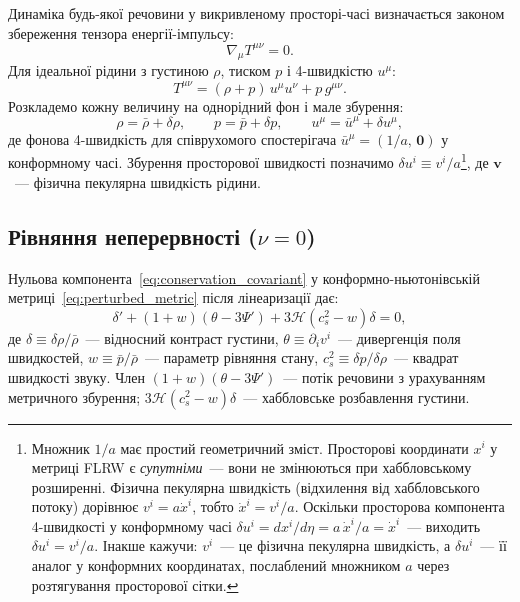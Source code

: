 Динаміка будь-якої речовини у викривленому просторі-часі
визначається законом збереження тензора енергії-імпульсу:
\begin{equation}\label{eq:conservation_covariant}
  \nabla_\mu T^{\mu\nu} = 0.
\end{equation}
Для ідеальної рідини з густиною $\rho$, тиском $p$ і
4-швидкістю $u^\mu$:
\begin{equation}\label{eq:Tmunu_fluid}
  T^{\mu\nu} = (\rho + p)\,u^\mu u^\nu + p\,g^{\mu\nu}.
\end{equation}
Розкладемо кожну величину на однорідний фон і мале збурення:
\begin{equation*}
  \rho = \bar\rho + \delta\rho, \qquad
  p    = \bar p   + \delta p,   \qquad
  u^\mu = \bar u^\mu + \delta u^\mu,
\end{equation*}
де фонова 4-швидкість для співрухомого спостерігача
$\bar u^\mu = (1/a,\, \mathbf{0})$ у конформному часі.
Збурення просторової швидкості позначимо
$\delta u^i \equiv v^i/a$\footnote{%
Множник $1/a$ має простий геометричний зміст.
Просторові координати $x^i$ у метриці FLRW є \emph{супутніми}~---
вони не змінюються при хаббловському розширенні.
Фізична пекулярна швидкість (відхилення від хаббловського потоку)
дорівнює $v^i = a\dot{x}^i$, тобто $\dot{x}^i = v^i/a$.
Оскільки просторова компонента 4-швидкості у конформному часі
$\delta u^i = dx^i/d\eta = a\,\dot{x}^i/a = \dot{x}^i$~---
виходить $\delta u^i = v^i/a$.
Інакше кажучи: $v^i$~--- це фізична пекулярна швидкість,
а $\delta u^i$~--- її аналог у конформних координатах,
послаблений множником $a$ через розтягування просторової сітки.%
}, де $\mathbf{v}$~--- фізична
пекулярна швидкість рідини.

\subsection*{Рівняння неперервності ($\nu = 0$)}

Нульова компонента~\eqref{eq:conservation_covariant}
у конформно-ньютонівській метриці~\eqref{eq:perturbed_metric}
після лінеаризації дає:
\begin{equation}\label{eq:continuity_general}
  \delta' + (1+w)\left(\theta - 3\Psi'\right)
  + 3\mathcal{H}\left(c_s^2 - w\right)\delta = 0,
\end{equation}
де $\delta \equiv \delta\rho/\bar\rho$~--- відносний контраст
густини, $\theta \equiv \partial_i v^i$~--- дивергенція поля
швидкостей, $w \equiv \bar p/\bar\rho$~--- параметр рівняння
стану, $c_s^2 \equiv \delta p/\delta\rho$~--- квадрат швидкості
звуку. Член $(1+w)(\theta - 3\Psi')$~--- потік речовини з
урахуванням метричного збурення; $3\mathcal{H}(c_s^2 - w)\delta$~---
хаббловське розбавлення густини.

